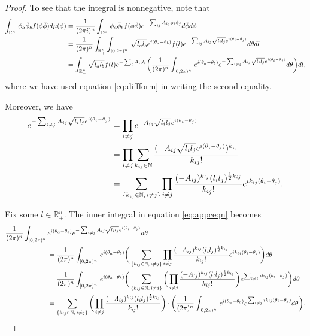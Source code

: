 \documentclass[10pt,a4paper]{amsart}
\newcommand{\compi}{\textnormal{i}}
\begin{document}
\begin{proof}
To see that
the integral is nonnegative, note that
    \begin{align}   \label{eq:appceqn}
    \int_{\mathbb{C}^n}\, \phi_a\bar{\phi}_b f(\phi\bar{\phi}) d\mu(\phi) & = \frac{1}{(2\pi\compi)^n}\int_{\mathbb{C}^n}\, \phi_a\bar{\phi}_b f(\phi\bar{\phi}) e^{-\sum_{ij} A_{ij}\phi_i\bar{\phi}_j} d\bar{\phi}d\phi \nonumber\\
    & = \frac{1}{(2\pi)^n}\int_{\mathbb{R}_+^n}\int_{[0,2\pi)^n}\, \sqrt{l_a l_b}e^{\compi(\theta_a-\theta_b)} f(l) e^{-\sum_{ij} A_{ij}\sqrt{l_i l_j}e^{\compi(\theta_i-\theta_j)}} d\theta dl \nonumber\\
    & = \int_{\mathbb{R}_+^n}\sqrt{l_a l_b} f(l) e^{-\sum_{i} A_{ii}l_i}\bigg(\frac{1}{(2\pi)^n}\int_{[0,2\pi)^n}\, e^{\compi(\theta_a-\theta_b)}   e^{-\sum_{i\neq j} A_{ij}\sqrt{l_i l_j}e^{\compi(\theta_i-\theta_j)}} d\theta\bigg) dl,
    \end{align}
where we have used equation \eqref{eq:diffform} in writing the second equality.

Moreover, we have
    \begin{align*}
    e^{-\sum_{i\neq j} A_{ij}\sqrt{l_i l_j}e^{\compi(\theta_i-\theta_j)}} & = \prod_{i\neq j}e^{- A_{ij}\sqrt{l_i l_j}e^{\compi(\theta_i-\theta_j)}}\\
    & = \prod_{i\neq j}\sum_{k_{ij}\in\mathbb{N}} \frac{(- A_{ij}\sqrt{l_i l_j}e^{\compi(\theta_i-\theta_j)})^{k_{ij}}}{k_{ij}!}\\
    & = \sum_{\{k_{ij}\in\mathbb{N}, \,i\neq j\}}\prod_{i\neq j} \frac{(- A_{ij})^{k_{ij}}(l_i l_j)^{\frac{1}{2}k_{ij}}}{k_{ij}!}e^{\compi k_{ij}(\theta_i-\theta_j)}.
    \end{align*}

Fix some $l\in\mathbb{R}_+^n$. The inner integral in equation \eqref{eq:appceqn} becomes
    \begin{align*}
    \frac{1}{(2\pi)^n}\int_{[0,2\pi)^n}\, & e^{\compi(\theta_a-\theta_b)}   e^{-\sum_{i\neq j} A_{ij}\sqrt{l_i l_j}e^{\compi(\theta_i-\theta_j)}} d\theta \\
    &= \frac{1}{(2\pi)^n}\int_{[0,2\pi)^n}\, e^{\compi(\theta_a-\theta_b)}\bigg(\sum_{\{k_{ij}\in\mathbb{N}, \,i\neq j\}}\prod_{i\neq j} \frac{(- A_{ij})^{k_{ij}}(l_i l_j)^{\frac{1}{2}k_{ij}}}{k_{ij}!}e^{\compi k_{ij}(\theta_i-\theta_j)}\bigg) d\theta  \\
    &= \frac{1}{(2\pi)^n}\int_{[0,2\pi)^n}\, e^{\compi(\theta_a-\theta_b)}\bigg(\sum_{\{k_{ij}\in\mathbb{N}, \,i\neq j\}}\bigg(\prod_{i\neq j} \frac{(- A_{ij})^{k_{ij}}(l_i l_j)^{\frac{1}{2}k_{ij}}}{k_{ij}!}\bigg)e^{\sum_{i\neq j}\compi k_{ij}(\theta_i-\theta_j)}\bigg) d\theta  \\
    &= \sum_{\{k_{ij}\in\mathbb{N}, \,i\neq j\}}\bigg(\prod_{i\neq j} \frac{(- A_{ij})^{k_{ij}}(l_i l_j)^{\frac{1}{2}k_{ij}}}{k_{ij}!}\bigg)\cdot\bigg(\frac{1}{(2\pi)^n}\int_{[0,2\pi)^n}\, e^{\compi(\theta_a-\theta_b)}e^{\sum_{i\neq j}\compi k_{ij}(\theta_i-\theta_j)} d\theta\bigg).
    \end{align*}


\end{proof}
\end{document}

